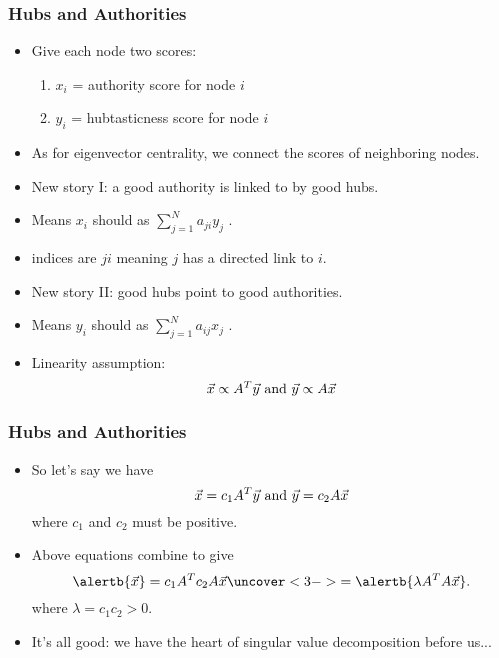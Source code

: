 \begin{frame}
  \frametitle{Hubs and Authorities}

  \begin{itemize}
  \item<1->
    Give each node two scores:
    \begin{enumerate}
    \item<2-> 
      \alert{$x_i$} = \alert{authority score} for node $i$
    \item<3-> 
      \alert{$y_i$} = \alert{hubtasticness score} for node $i$
    \end{enumerate}
  \item<4->
    As for eigenvector centrality, we connect
    the scores of neighboring nodes.
  \item<5->
    New story I: a good authority is linked to by good hubs.
  \item<6->
    Means
    \alert{$x_i$} should  as
    \alert{$\sum_{j=1}^{N} a_{ji} y_j$} .
  \item<7->
     indices are $ji$ meaning
    $j$ has a directed link to $i$.
  \item<8->
    New story II: good hubs point to good authorities.
  \item<9->
    Means
    \alert{$y_i$} should  as
    \alert{$\sum_{j=1}^{N} a_{ij} x_j$} .
  \item<10->
    Linearity assumption:
    $$
    \vec{x} \propto A^{T} \vec{y}
    \ \textnormal{and} \
    \vec{y} \propto A \vec{x}
    $$
  \end{itemize}

\end{frame}

\begin{frame}
  \frametitle{Hubs and Authorities}
  
  \begin{itemize}
  \item<1->
    So let's say we have
    $$
    \vec{x} = c_1 A^{T} \vec{y}
    \ \textnormal{and} \
    \vec{y} = c_2 A \vec{x}
    $$
    where $c_1$ and $c_2$ must be positive.
  \item<2->
    Above equations combine to give
    $$
    \alertb{\vec{x}} = c_1 A^{T} c_2 A \vec{x}
    \uncover<3->{ 
      =
      \alertb{\lambda A^{T} A \vec{x}}.
    }
    $$
    where $\lambda = c_1c_2 > 0$.
  \item<3->
    \alert{It's all good:} we have the heart
    of singular value decomposition before us...
  \end{itemize}
  
\end{frame}

